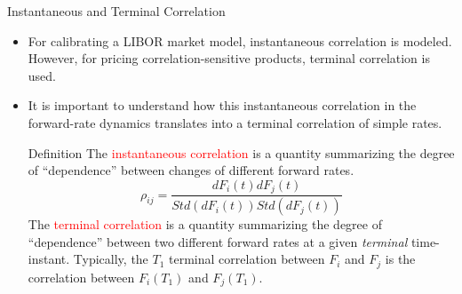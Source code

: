 \documentclass{beamer}
\begin{document}
\begin{frame}{Instantaneous and Terminal Correlation}
  \begin{itemize}
  \item For calibrating a LIBOR market model, instantaneous
    correlation is modeled. However, for pricing correlation-sensitive products, terminal correlation is used.
  \item It is important to understand how this instantaneous correlation in the forward-rate dynamics translates into a terminal correlation of simple rates.
    
    \begin{block}{Definition}
      The \textcolor{red}{instantaneous correlation} is a quantity summarizing the degree of “dependence” between changes of different forward rates.
      \begin{equation*}
        \rho_{ij} = \frac{dF_i(t) dF_j(t)}{Std(dF_i(t)) Std(dF_j(t))}
      \end{equation*}
      The \textcolor{red}{terminal correlation} is a quantity summarizing the degree of “dependence” between two different forward rates at a given \emph{terminal} time-instant. Typically, the $T_1$ terminal correlation between $F_i$ and $F_j$ is the correlation between $F_i(T_1)$ and $F_j(T_1)$.
    \end{block}
    
  \end{itemize}
\end{frame}
\end{document}
